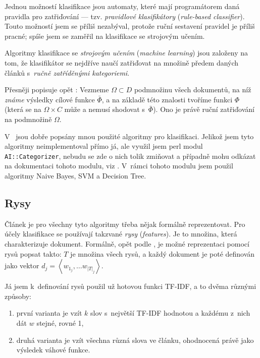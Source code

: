 \documentclass[12pt,a4paper]{report}
\begin{document}
Jednou možností klasifikace jsou automaty, které mají programátorem daná pravidla pro zatřiďování --- tzv. \emph{pravidlové klasifikátory} (\emph{rule-based classifier}). Touto možností jsem se příliš nezabýval, protože ruční sestavení pravidel je příliš pracné; spíše jsem se zaměřil na klasifikace se strojovým učením.

Algoritmy klasifikace se \emph{strojovým učením} (\emph{machine learning}) jsou založeny na tom, že klasifikátor se nejdříve naučí zatřiďovat na množině předem daných článků s~\emph{ručně zatříděnými kategoriemi}.

Přesněji popisuje opět \cite{machine_intro}: Vezmeme $\Omega \subset D$ podmnožinu všech dokumentů, na níž \emph{známe} výsledky cílové funkce $\bar{\Phi}$, a na základě této znalosti tvoříme funkci $\Phi$ (která se na $\Omega\times C$ může a nemusí shodovat s~$\bar{\Phi}$). Ono  je právě ruční zatřiďování na podmnožině $\Omega$.

V~\cite{machine_intro} jsou dobře popsány mnou použité algoritmy pro klasifikaci. Jelikož jsem tyto algoritmy neimplementoval přímo já, ale využil jsem perl modul \texttt{AI::Categorizer}, nebudu se zde o nich tolik zmiňovat a případně mohu odkázat na dokumentaci tohoto mo\-du\-lu, viz \cite{algorithmnaivebayes}. V~rámci tohoto mo\-du\-lu jsem použil algoritmy Naive Bayes, SVM a Decision Tree.


\subsection{Rysy}

Článek je pro všechny tyto algoritmy třeba nějak formálně reprezentovat. Pro účely klasifikace se používají takzvané \emph{rysy} (\emph{features}). Je to množina, která charakterizuje dokument. Formálně, opět podle \cite{machine_intro}, je možné reprezentaci pomocí rysů popsat takto: $T$ je množina všech rysů, a každý dokument je poté definován jako vektor $d_j=\left<w_{1_j}, \ldots w_{\left|T\right|_j}\right>$.

Já jsem k~definování rysů použil už hotovou funkci TF-IDF, a to dvěma různými způsoby:

\begin{enumerate}
    \item první varianta je vzít $k$ slov s~největší TF-IDF hodnotou a každému z~nich dát $w$ stejné, rovné 1,
    \item druhá varianta je vzít všechna různá slova ve článku, ohodnocená právě jako výsledek váhové funkce.
\end{enumerate}
\end{document}
